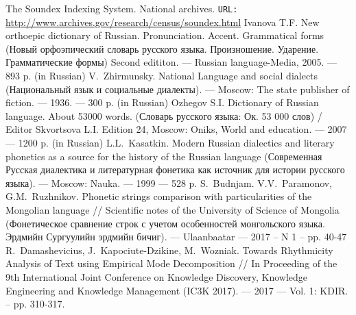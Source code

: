 \documentclass{svproc}
\begin{document}
\begin{thebibliography}{18}
	The Soundex Indexing System. National archives. \texttt{URL:} \url{http://www.archives.gov/research/census/soundex.html}
 Ivanova T.F. New orthoepic dictionary of Russian. Pronunciation. Accent. Grammatical forms (Новый орфоэпический словарь русского языка. Произношение. Ударение. Грамматические формы) Second edititon. --- Russian language-Media, 2005. --- 893 p. (in Russian)
 V.~Zhirmunsky. National Language and social dialects (Национальный язык и социальные диалекты). --- Moscow: The state publisher of fiction. --- 1936. --- 300 p. (in Russian)
 Ozhegov S.I. Dictionary of Russian language. About 53000 words. (Словарь русского языка: Ок. 53 000 слов) / Editor Skvortsova L.I. Edition 24, Moscow: Oniks, World and education. --- 2007 --- 1200 p. (in Russian)
 L.L.~Kasatkin. Modern Russian dialectics and literary phonetics as a source for the history of the Russian language (Современная Русская диалектика и литературная фонетика как источник для истории русского языка). --- Moscow: Nauka. --- 1999 --- 528 p.
 S.~Budnjam. V.V.~Paramonov, G.M.~Ruzhnikov. Phonetic strings comparison with particularities of the Mongolian language // Scientific notes of the University of Science of Mongolia (Фонетическое сравнение строк с учетом особенностей монгольского языка. Эрдмийн Сургуулийн эрдмийн бичиг). --- Ulaanbaatar --- 2017 -- N 1 -- pp. 40-47
 R.~Damashevicius, J.~Kapociute-Dzikine, M.~Wozniak. Towards Rhythmicity Analysis of Text using Empirical Mode Decomposition // In Proceeding of the 9th International Joint Conference on Knowledge Discovery, Knowledge Engineering and Knowledge Management (IC3K 2017). --- 2017 --- Vol. 1: KDIR. -- pp. 310-317.

\end{thebibliography}
\end{document}
